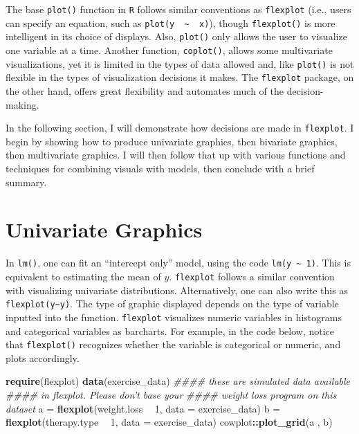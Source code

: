 \documentclass[
  man]{apa6}
\newenvironment{Shaded}{\begin{snugshade}}{\end{snugshade}}
\newcommand{\CommentTok}[1]{\textcolor[rgb]{0.56,0.35,0.01}{\textit{#1}}}
\newcommand{\DataTypeTok}[1]{\textcolor[rgb]{0.13,0.29,0.53}{#1}}
\newcommand{\DecValTok}[1]{\textcolor[rgb]{0.00,0.00,0.81}{#1}}
\newcommand{\KeywordTok}[1]{\textcolor[rgb]{0.13,0.29,0.53}{\textbf{#1}}}
\newcommand{\NormalTok}[1]{#1}
\newcommand{\OperatorTok}[1]{\textcolor[rgb]{0.81,0.36,0.00}{\textbf{#1}}}
\newcommand{\StringTok}[1]{\textcolor[rgb]{0.31,0.60,0.02}{#1}}
\begin{document}
The base \texttt{plot()} function in \texttt{R} follows similar conventions as \texttt{flexplot} (i.e., users can specify an equation, such as \texttt{plot(y\ \ \textasciitilde{}\ \ x)}), though \texttt{flexplot()} is more intelligent in its choice of displays. Also, \texttt{plot()} only allows the user to visualize one variable at a time. Another function, \texttt{coplot()}, allows some multivariate visualizations, yet it is limited in the types of data allowed and, like \texttt{plot()} is not flexible in the types of visualization decisions it makes. The \texttt{flexplot} package, on the other hand, offers great flexibility and automates much of the decision-making.

In the following section, I will demonstrate how decisions are made in \texttt{flexplot}. I begin by showing how to produce univariate graphics, then bivariate graphics, then multivariate graphics. I will then follow that up with various functions and techniques for combining visuals with models, then conclude with a brief summary.

\hypertarget{univariate-graphics}{%
\section{Univariate Graphics}\label{univariate-graphics}}

In \texttt{lm()}, one can fit an \enquote{intercept only} model, using the code \texttt{lm(y\ \textasciitilde{}\ 1)}. This is equivalent to estimating the mean of \(y\). \texttt{flexplot} follows a similar convention with visualizing univariate distributions. Alternatively, one can also write this as \texttt{flexplot(y\textasciitilde{}y)}. The type of graphic displayed depends on the type of variable inputted into the function. \texttt{flexplot} visualizes numeric variables in histograms and categorical variables as barcharts. For example, in the code below, notice that \texttt{flexplot()} recognizes whether the variable is categorical or numeric, and plots accordingly.

\begin{Shaded}
\begin{Highlighting}[]
\KeywordTok{require}\NormalTok{(flexplot)}
\KeywordTok{data}\NormalTok{(exercise_data) }\CommentTok{#### these are simulated data available }
                    \CommentTok{#### in flexplot. Please don't base your }
                    \CommentTok{#### weight loss program on this dataset}
\NormalTok{a =}\StringTok{ }\KeywordTok{flexplot}\NormalTok{(weight.loss }\OperatorTok{~}\StringTok{ }\DecValTok{1}\NormalTok{, }\DataTypeTok{data =}\NormalTok{ exercise_data)}
\NormalTok{b =}\StringTok{ }\KeywordTok{flexplot}\NormalTok{(therapy.type }\OperatorTok{~}\StringTok{ }\DecValTok{1}\NormalTok{, }\DataTypeTok{data =}\NormalTok{ exercise_data)}
\NormalTok{cowplot}\OperatorTok{::}\KeywordTok{plot_grid}\NormalTok{(a , b)}
\end{Highlighting}
\end{Shaded}
\end{document}
